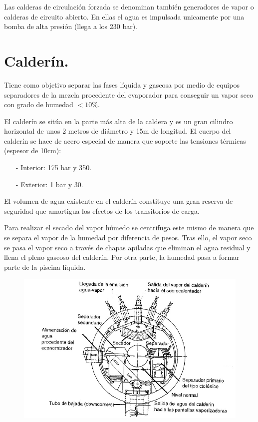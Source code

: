 Las calderas de circulación forzada se denominan también generadores de vapor o calderas de circuito abierto. En ellas el agua es impulsada unicamente por una bomba de alta presión (llega a los 230 bar).
\section{Calderín.}
Tiene como objetivo separar las fases líquida y gaseosa por medio de equipos separadores de la mezcla procedente del evaporador para conseguir un vapor seco con grado de humedad $<10\%$. 



El calderín se sitúa en la parte más alta de la caldera y es un gran cilindro horizontal de unos 2 metros de diámetro y 15m de longitud. El cuerpo del calderín se hace de acero especial de manera que soporte las tensiones térmicas (espesor de 10cm):
\begin{itemize}
	\item [-] Interior: 175 bar y 350\grado.
	\item [-] Exterior: 1 bar y 30\grado.
\end{itemize}




El volumen de agua existente en el calderín constituye una gran reserva de
seguridad que amortigua los efectos de los transitorios de carga.



Para realizar el secado del vapor húmedo se centrifuga este mismo de manera que se separa el vapor de la humedad por diferencia de pesos. Tras ello, el vapor seco se pasa el vapor seco a través de chapas apiladas que eliminan el agua residual y llena el pleno gaseoso del calderín. Por otra parte, la humedad pasa a formar parte de la piscina líquida.
\begin{figure}[H]
	\centering
	\includegraphics[width=0.7\linewidth]{res/tema10/calderin}
	\label{fig:calderin}
\end{figure}

